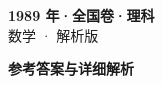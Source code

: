 \documentclass[zihao=-4, a4paper]{ctexart}
\begin{document}
\begin{center}
  {\Large\bfseries 1989 年·全国卷·理科}\\[4pt]
  {\large 数学 · 解析版}
\end{center}
\medskip
{}

\clearpage
{}
\begin{center}{\Large\bfseries 参考答案与详细解析}\end{center}
\medskip

\end{document}
